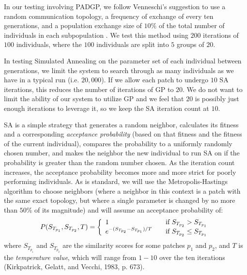 \documentclass[12pt]{report} 	%
\numberwithin{figure}{chapter}
\numberwithin{table}{chapter}
\numberwithin{equation}{chapter}
\begin{document}
\begin{flushleft}
In our testing involving PADGP, we follow Venneschi's suggestion to use a random communication topology, a frequency of exchange of every ten generations, and a population exchange size of $10\%$ of the total number of individuals in each subpopulation \cite[p. 190]{Vanneschi:2004le}. We test this method using $200$ iterations of $100$ individuals, where the $100$ individuals are split into $5$ groups of $20$.

In testing Simulated Annealing on the parameter set of each individual between generations, we limit the system to search through as many individuals as we have in a typical run (i.e. $20,000$). If we allow each patch to undergo $10$ SA iterations, this reduces the number of iterations of GP to $20$. We do not want to limit the ability of our system to utilize GP and we feel that $20$ is possibly just enough iterations to leverage it, so we keep the SA iteration count at $10$. 

SA is a simple strategy that generates a random neighbor, calculates its fitness and a corresponding \textit{acceptance probability} (based on that fitness and the fitness of the current individual), compares the probability to a uniformly randomly chosen number, and makes the neighbor the new individual to run SA on if the probability is greater than the random number chosen. As the iteration count increases, the acceptance probability becomes more and more strict for poorly performing individuals. As is standard, we will use the Metropolis-Hastings algorithm to choose neighbors (where a neighbor in this context is a patch with the same exact topology, but where a single parameter is changed by no more than $50\%$ of its magnitude) and will assume an acceptance probability of:
\begin{equation}
P(S_{T_{p_1}}, S_{T_{p_2}}, T) = \left\{
   \begin{array}{l l}
    1 & \quad \text{if $S_{T_{p_2}}>S_{T_{p_1}}$}\\
    e^{-(S_{T_{p_2}} - S_{T_{p_1}})/T} & \quad \text{if $S_{T_{p_2}}\leq S_{T_{p_1}}$}
    \end{array} \right.
\end{equation}
where $S_{T_{p_1}}$ and $S_{T_{p_2}}$ are the similarity scores for some patches $p_1$ and $p_2$, and $T$ is the \textit{temperature value}, which will range from $1-10$ over the ten iterations (Kirkpatrick, Gelatt, and Vecchi, 1983, p. 673).


\end{flushleft}
\end{document}
